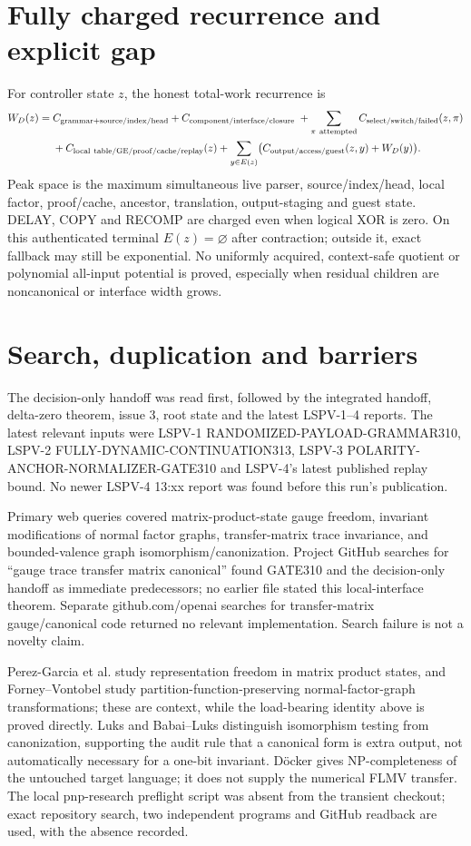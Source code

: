 \documentclass[11pt]{article}
\begin{document}
\section{Fully charged recurrence and explicit gap}
For controller state $z$, the honest total-work recurrence is
\[
\begin{aligned}
W_D(z)={}&C_{\rm grammar+source/index/head}
+C_{\rm component/interface/closure}\;+
\sum_{\pi\ \rm attempted}C_{\rm select/switch/failed}(z,\pi)\\
&+C_{\rm local\ table/GE/proof/cache/replay}(z)
+\sum_{y\in E(z)}\bigl(C_{\rm output/access/guest}(z,y)+W_D(y)\bigr).
\end{aligned}
\]
Peak space is the maximum simultaneous live parser, source/index/head, local
factor, proof/cache, ancestor, translation, output-staging and guest state.
DELAY, COPY and RECOMP are charged even when logical XOR is zero.  On this
authenticated terminal $E(z)=\varnothing$ after contraction; outside it, exact
fallback may still be exponential.  No uniformly acquired, context-safe quotient
or polynomial all-input potential is proved, especially when residual children
are noncanonical or interface width grows.

\section{Search, duplication and barriers}
The decision-only handoff was read first, followed by the integrated handoff,
delta-zero theorem, issue 3, root state and the latest LSPV-1--4 reports.  The
latest relevant inputs were LSPV-1 RANDOMIZED-PAYLOAD-GRAMMAR310, LSPV-2
FULLY-DYNAMIC-CONTINUATION313, LSPV-3 POLARITY-ANCHOR-NORMALIZER-GATE310 and
LSPV-4's latest published replay bound.  No newer LSPV-4 13:xx report was found
before this run's publication.

Primary web queries covered matrix-product-state gauge freedom, invariant
modifications of normal factor graphs, transfer-matrix trace invariance, and
bounded-valence graph isomorphism/canonization.  Project GitHub searches for
``gauge trace transfer matrix canonical'' found GATE310 and the decision-only
handoff as immediate predecessors; no earlier file stated this local-interface
theorem.  Separate github.com/openai searches for transfer-matrix gauge/canonical
code returned no relevant implementation.  Search failure is not a novelty claim.

Perez-Garcia et al. study representation freedom in matrix product states, and
Forney--Vontobel study partition-function-preserving normal-factor-graph
transformations; these are context, while the load-bearing identity above is
proved directly.  Luks and Babai--Luks distinguish isomorphism testing from
canonization, supporting the audit rule that a canonical form is extra output,
not automatically necessary for a one-bit invariant.  D\"ocker gives
NP-completeness of the untouched target language; it does not supply the numerical
FLMV transfer.  The local pnp-research preflight script was absent from the
transient checkout; exact repository search, two independent programs and GitHub
readback are used, with the absence recorded.
\end{document}
